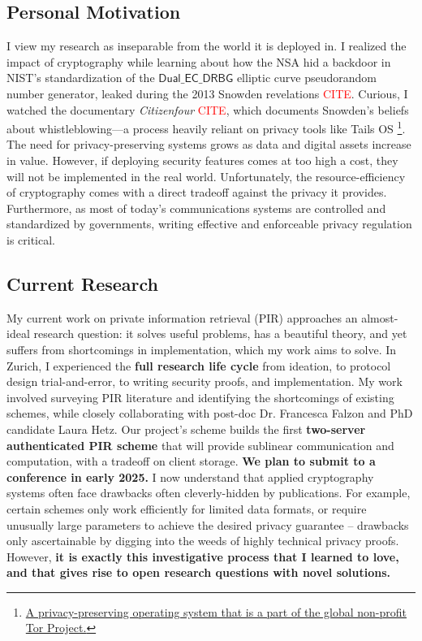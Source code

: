 \documentclass{article}
\newcommand{\code}[1]{\mathsf{#1}}
\newcommand{\TODO}[1]{\textcolor{red}{#1}}
\newcommand{\aftersep}{\vspace{-0.3cm}}
\newcommand{\beforesep}{\vspace{-0.2cm}}
\begin{document}
\aftersep
\subsection*{Personal Motivation}
\beforesep

I view my research as inseparable from the world it is deployed in. I realized the impact of cryptography while learning about how the NSA hid a backdoor in NIST’s standardization of the $\code{Dual\_EC\_DRBG}$ elliptic curve pseudorandom number generator, leaked during the 2013 Snowden revelations \TODO{CITE}. Curious, I watched the documentary \textit{Citizenfour} \TODO{CITE}, which documents Snowden’s beliefs about whistleblowing—a process heavily reliant on privacy tools like Tails OS \footnote{\href{https://tails.net/}{A privacy-preserving operating system that is a part of the global non-profit Tor Project.}}. The need for privacy-preserving systems grows as data and digital assets increase in value. However, if deploying security features comes at too high a cost, they will not be implemented in the real world. Unfortunately, the resource-efficiency of cryptography comes with a direct tradeoff against the privacy it provides. Furthermore, as most of today’s communications systems are controlled and standardized by governments, writing effective and enforceable privacy regulation is critical. 

\aftersep
\subsection*{Current Research}
\beforesep

My current work on private information retrieval (PIR) approaches an almost-ideal research question: it solves useful problems, has a beautiful theory, and yet suffers from shortcomings in implementation, which my work aims to solve. In Zurich, I experienced the \textbf{full research life cycle} from ideation, to protocol design trial-and-error, to writing security proofs, and implementation. My work involved surveying PIR literature and identifying the shortcomings of existing schemes, while closely collaborating with post-doc Dr. Francesca Falzon and PhD candidate Laura Hetz. Our project’s scheme builds the first \textbf{two-server authenticated PIR scheme} that will provide sublinear communication and computation, with a tradeoff on client storage. \textbf{We plan to submit to a conference in early 2025.} I now understand that applied cryptography systems often face drawbacks often cleverly-hidden by publications. For example, certain schemes only work efficiently for limited data formats, or require unusually large parameters to achieve the desired privacy guarantee -- drawbacks only ascertainable by digging into the weeds of highly technical privacy proofs. However, \textbf{it is exactly this investigative process that I learned to love, and that gives rise to open research questions with novel solutions.}
\end{document}
